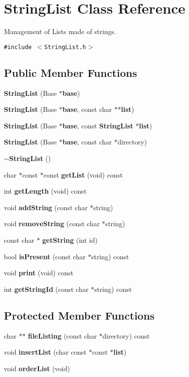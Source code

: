 \section{StringList Class Reference}
\label{classStringList}
Management of Lists made of strings.  


{\tt \#include $<$StringList.h$>$}

\subsection*{Public Member Functions}
\begin{CompactItemize}
\item 
{\bf StringList} (Base $\ast${\bf base})
\item 
{\bf StringList} (Base $\ast${\bf base}, const char $\ast$$\ast${\bf list})
\item 
{\bf StringList} (Base $\ast${\bf base}, const {\bf StringList} $\ast${\bf list})
\item 
{\bf StringList} (Base $\ast${\bf base}, const char $\ast$directory)
\item 
{\bf $\sim$StringList} ()
\item 
char $\ast$const $\ast$const {\bf getList} (void) const 
\item 
int {\bf getLength} (void) const 
\item 
void {\bf addString} (const char $\ast$string)
\item 
void {\bf removeString} (const char $\ast$string)
\item 
const char $\ast$ {\bf getString} (int id)
\item 
bool {\bf isPresent} (const char $\ast$string) const 
\item 
void {\bf print} (void) const 
\item 
int {\bf getStringId} (const char $\ast$string) const 
\end{CompactItemize}
\subsection*{Protected Member Functions}
\begin{CompactItemize}
\item 
char $\ast$$\ast$ {\bf fileListing} (const char $\ast$directory) const 
\item 
void {\bf insertList} (char const $\ast$const $\ast${\bf list})
\item 
void {\bf orderList} (void)
\end{CompactItemize}
